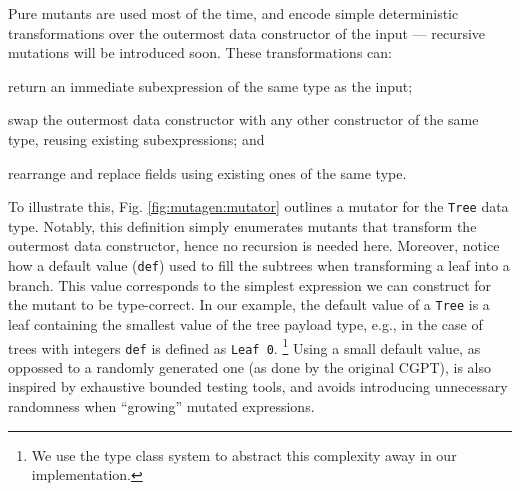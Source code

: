 \documentclass[sigconf, anonymous, review]{acmart}
\newcommand{\mutagen}{\textsc{Mutagen}\xspace}
\begin{document}
Pure mutants are used most of the time, and encode simple deterministic
transformations over the outermost data constructor of the input --- recursive
mutations will be introduced soon.
%
These transformations can:
%
\begin{inparaenum}
\item return an immediate subexpression of the same type as the input;
\item swap the outermost data constructor with any other constructor of the
  same type, reusing existing subexpressions; and
\item rearrange and replace fields using existing ones of the same type.
\end{inparaenum}
%
To illustrate this, Fig. \ref{fig:mutagen:mutator} outlines a mutator for the
\texttt{Tree} data type.
%
Notably, this definition simply enumerates mutants that transform the outermost
data constructor, hence no recursion is needed here.
%
Moreover, notice how a default value (\texttt{def}) used to fill the subtrees
when transforming a leaf into a branch.
%
This value corresponds to the simplest expression we can construct for the
mutant to be type-correct.
%
In our example, the default value of a \texttt{Tree} is a leaf containing the
smallest value of the tree payload type, e.g., in the case of trees with
integers \texttt{def} is defined as \texttt{Leaf 0}.
%
\footnote{We use the type class system to abstract this complexity away in our
  implementation.}
%
Using a small default value, as oppossed to a randomly generated one (as done by
the original CGPT), is also inspired by exhaustive bounded testing tools, and
avoids introducing unnecessary randomness when ``growing'' mutated expressions.

\end{document}
